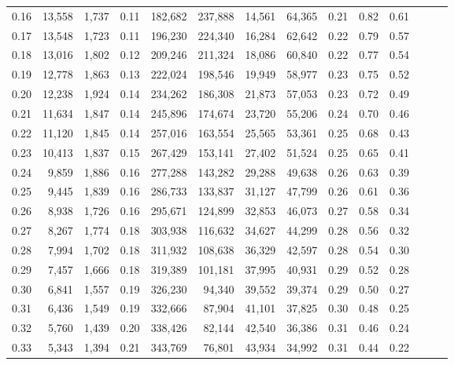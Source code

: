 \begin{tabular}{rrrrrrrrrrrrrr}
0.16 &  13,558 &  1,737 &  0.11 &  182,682 &  237,888 &  14,561 &  64,365 &  0.21 &  0.82 &      0.61 \\
0.17 &  13,548 &  1,723 &  0.11 &  196,230 &  224,340 &  16,284 &  62,642 &  0.22 &  0.79 &      0.57 \\
0.18 &  13,016 &  1,802 &  0.12 &  209,246 &  211,324 &  18,086 &  60,840 &  0.22 &  0.77 &      0.54 \\
0.19 &  12,778 &  1,863 &  0.13 &  222,024 &  198,546 &  19,949 &  58,977 &  0.23 &  0.75 &      0.52 \\
0.20 &  12,238 &  1,924 &  0.14 &  234,262 &  186,308 &  21,873 &  57,053 &  0.23 &  0.72 &      0.49 \\
0.21 &  11,634 &  1,847 &  0.14 &  245,896 &  174,674 &  23,720 &  55,206 &  0.24 &  0.70 &      0.46 \\
0.22 &  11,120 &  1,845 &  0.14 &  257,016 &  163,554 &  25,565 &  53,361 &  0.25 &  0.68 &      0.43 \\
0.23 &  10,413 &  1,837 &  0.15 &  267,429 &  153,141 &  27,402 &  51,524 &  0.25 &  0.65 &      0.41 \\
0.24 &   9,859 &  1,886 &  0.16 &  277,288 &  143,282 &  29,288 &  49,638 &  0.26 &  0.63 &      0.39 \\
0.25 &   9,445 &  1,839 &  0.16 &  286,733 &  133,837 &  31,127 &  47,799 &  0.26 &  0.61 &      0.36 \\
0.26 &   8,938 &  1,726 &  0.16 &  295,671 &  124,899 &  32,853 &  46,073 &  0.27 &  0.58 &      0.34 \\
0.27 &   8,267 &  1,774 &  0.18 &  303,938 &  116,632 &  34,627 &  44,299 &  0.28 &  0.56 &      0.32 \\
0.28 &   7,994 &  1,702 &  0.18 &  311,932 &  108,638 &  36,329 &  42,597 &  0.28 &  0.54 &      0.30 \\
0.29 &   7,457 &  1,666 &  0.18 &  319,389 &  101,181 &  37,995 &  40,931 &  0.29 &  0.52 &      0.28 \\
0.30 &   6,841 &  1,557 &  0.19 &  326,230 &   94,340 &  39,552 &  39,374 &  0.29 &  0.50 &      0.27 \\
0.31 &   6,436 &  1,549 &  0.19 &  332,666 &   87,904 &  41,101 &  37,825 &  0.30 &  0.48 &      0.25 \\
0.32 &   5,760 &  1,439 &  0.20 &  338,426 &   82,144 &  42,540 &  36,386 &  0.31 &  0.46 &      0.24 \\
0.33 &   5,343 &  1,394 &  0.21 &  343,769 &   76,801 &  43,934 &  34,992 &  0.31 &  0.44 &      0.22 \\

\end{tabular}
